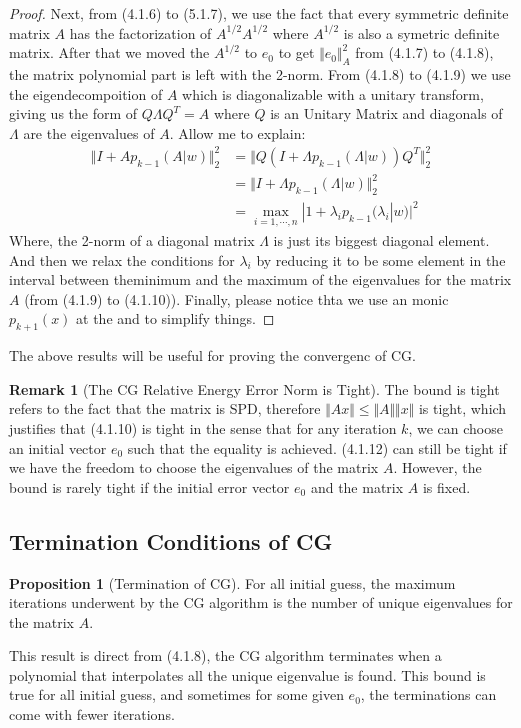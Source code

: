 \documentclass[]{article}
\theoremstyle{definition}
\newtheorem{prop}{Proposition}[section]  %
\newtheorem{remark}{Remark}[subsection]
\begin{document}
\begin{proof}
            \par
            Next, from (4.1.6) to (5.1.7), we use the fact that every symmetric definite matrix $A$ has the factorization of $A^{1/2}A^{1/2}$ where $A^{1/2}$ is also a symetric definite matrix. After that we moved the $A^{1/2}$ to $e_0$ to get $\Vert e_0\Vert_A^2$ from (4.1.7) to (4.1.8), the matrix polynomial part is left with the 2-norm. From (4.1.8) to (4.1.9) we use the eigendecompoition of $A$ which is diagonalizable with a unitary transform, giving us the form of $Q\Lambda Q^T = A$ where $Q$ is an Unitary Matrix and diagonals of $\Lambda$ are the eigenvalues of $A$. Allow me to explain: 
            \begin{align}
                \Vert I + Ap_{k - 1}(A|w)\Vert_2^2
                &= \Vert Q(I + \Lambda p_{k - 1}(\Lambda|w))Q^T\Vert_2^2
                \\
                &= \Vert I + \Lambda p_{k - 1}(\Lambda|w)\Vert_2^2
                \\
                &= \max_{i=1,\cdots, n}|1 + \lambda_ip_{k - 1}(\lambda_i|w)|^2
            \end{align}
            Where, the 2-norm of a diagonal matrix $\Lambda$ is just its biggest diagonal element. And then we relax the conditions for $\lambda_i$ by reducing it to be some element in the interval between theminimum and the maximum of the eigenvalues for the matrix $A$ (from (4.1.9) to (4.1.10)). Finally, please notice thta we use an monic $p_{k+1}(x)$ at the and to simplify things. 
        \end{proof}
        The above results will be useful for proving the convergenc of CG. 
        \begin{remark}[The CG Relative Energy Error Norm is Tight]
            The bound is tight refers to the fact that the matrix is SPD, therefore $\Vert Ax\Vert \le \Vert A\Vert\Vert x\Vert$ is tight, which justifies that (4.1.10) is tight in the sense that for any iteration $k$, we can choose an initial vector $e_0$ such that the equality is achieved. (4.1.12) can still be tight if we have the freedom to choose the eigenvalues of the matrix $A$. However, the bound is rarely tight if the initial error vector $e_0$ and the matrix $A$ is fixed. 
        \end{remark}
    \subsection{Termination Conditions of CG}
        \begin{prop}[Termination of CG]\label{prop:Termination_of_CG}
            For all initial guess, the maximum iterations underwent by the CG algorithm is the number of unique eigenvalues for the matrix $A$. 
        \end{prop}
        This result is direct from (4.1.8), the CG algorithm terminates when a polynomial that interpolates all the unique eigenvalue is found. This bound is true for all initial guess, and sometimes for some given $e_0$, the terminations can come with fewer iterations. 
\end{document}
